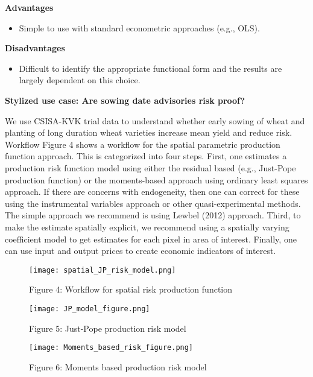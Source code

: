 \documentclass[
  letterpaper,
  DIV=11,
  numbers=noendperiod]{scrreprt}
\providecommand{\tightlist}{%
  \setlength{\itemsep}{0pt}\setlength{\parskip}{0pt}}\usepackage{longtable,booktabs,array}
\begin{document}
\textbf{Advantages}

\begin{itemize}
\tightlist
\item
  Simple to use with standard econometric approaches (e.g., OLS).
\end{itemize}

\textbf{Disadvantages}

\begin{itemize}
\tightlist
\item
  Difficult to identify the appropriate functional form and the results
  are largely dependent on this choice.
\end{itemize}

\textbf{Stylized use case: Are sowing date advisories risk proof?}

We use CSISA-KVK trial data to understand whether early sowing of wheat
and planting of long duration wheat varieties increase mean yield and
reduce risk. Workflow Figure 4 shows a workflow for the spatial
parametric production function approach. This is categorized into four
steps. First, one estimates a production risk function model using
either the residual based (e.g., Just-Pope production function) or the
moments-based approach using ordinary least squares approach. If there
are concerns with endogeneity, then one can correct for these using the
instrumental variables approach or other quasi-experimental methods. The
simple approach we recommend is using Lewbel (2012) approach. Third, to
make the estimate spatially explicit, we recommend using a spatially
varying coefficient model to get estimates for each pixel in area of
interest. Finally, one can use input and output prices to create
economic indicators of interest.

\begin{figure}[H]

{\centering \texttt{[image: spatial\_JP\_risk\_model.png]}

}

\caption{Figure 4: Workflow for spatial risk production function}

\end{figure}%
\begin{figure}[H]

{\centering \texttt{[image: JP\_model\_figure.png]}

}

\caption{Figure 5: Just-Pope production risk model}

\end{figure}%
\begin{figure}[H]

{\centering \texttt{[image: Moments\_based\_risk\_figure.png]}

}

\caption{Figure 6: Moments based production risk model}

\end{figure}%
\end{document}

